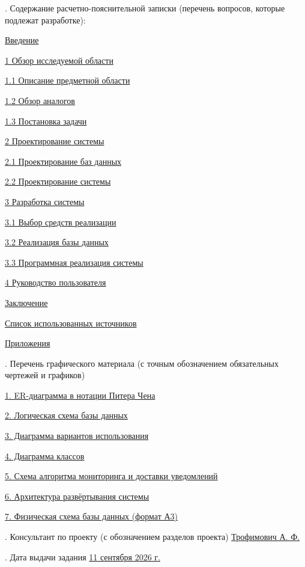 \smallskip
{}. Содержание расчетно-пояснительной записки (перечень вопросов, которые подлежат разработке):
\begin{description}
  \item \uline{Введение}
  \item \uline{1 Обзор исследуемой области}
  \item \uline{1.1 Описание предметной области}
  \item \uline{1.2 Обзор аналогов}
  \item \uline{1.3 Постановка задачи}
  \item \uline{2 Проектирование системы}
  \item \uline{2.1 Проектирование баз данных}
  \item \uline{2.2 Проектирование системы}
  \item \uline{3 Разработка системы}
  \item \uline{3.1 Выбор средств реализации}
  \item \uline{3.2 Реализация базы данных}
  \item \uline{3.3 Программная реализация системы}
  \item \uline{4 Руководство пользователя}
  \item \uline{Заключение}
  \item \uline{Список использованных источников}
  \item \uline{Приложения}
\end{description}

\smallskip
{}. Перечень графического материала (с точным обозначением обязательных чертежей и графиков)
\begin{description}
  \item \uline{1. ER-диаграмма в нотации Питера Чена}
  \item \uline{2. Логическая схема базы данных}
  \item \uline{3. Диаграмма вариантов использования}
  \item \uline{4. Диаграмма классов}
  \item \uline{5. Схема алгоритма мониторинга и доставки уведомлений}
  \item \uline{6. Архитектура развёртывания системы}
  \item \uline{7. Физическая схема базы данных (формат А3)}
\end{description}
\smallskip
{}. Консультант по проекту (с обозначением разделов проекта) \uline{Трофимович А. Ф. \hfill}

\smallskip
{}. Дата выдачи задания \uline{\hfill 11 сентября 2026 г.\hfill}

